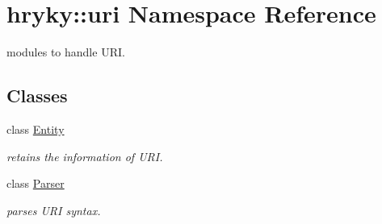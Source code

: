 \hypertarget{namespacehryky_1_1uri}{\section{hryky\-:\-:uri Namespace Reference}
\label{namespacehryky_1_1uri}
}


modules to handle U\-R\-I.  


\subsection*{Classes}
\begin{DoxyCompactItemize}
\item 
class \hyperlink{classhryky_1_1uri_1_1_entity}{Entity}
\begin{DoxyCompactList}\small\item\em retains the information of U\-R\-I. \end{DoxyCompactList}\item 
class \hyperlink{classhryky_1_1uri_1_1_parser}{Parser}
\begin{DoxyCompactList}\small\item\em parses U\-R\-I syntax. \end{DoxyCompactList}\end{DoxyCompactItemize}

